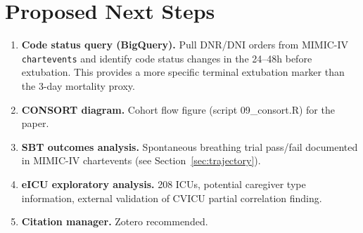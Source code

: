 \documentclass[11pt]{article}
\begin{document}
\section{Proposed Next Steps}

\begin{enumerate}[leftmargin=*]

\item \textbf{Code status query (BigQuery).} Pull DNR/DNI orders from
MIMIC-IV \texttt{chartevents} and identify code status changes in the 24--48h
before extubation. This provides a more specific terminal extubation marker
than the 3-day mortality proxy.

\item \textbf{CONSORT diagram.} Cohort flow figure (script 09\_consort.R)
for the paper.

\item \textbf{SBT outcomes analysis.} Spontaneous breathing trial pass/fail
documented in MIMIC-IV chartevents (see Section~\ref{sec:trajectory}).

\item \textbf{eICU exploratory analysis.} 208 ICUs, potential caregiver type
information, external validation of CVICU partial correlation finding.

\item \textbf{Citation manager.} Zotero recommended.

\end{enumerate}
\end{document}
